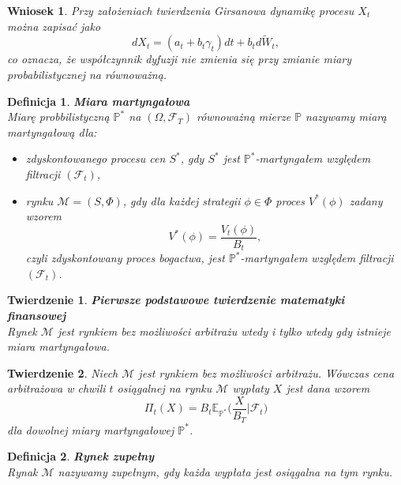 \documentclass{mini}
\theoremstyle{mythstyle}
\newtheorem{Twierdzenie}{Twierdzenie}[chapter]
\newtheorem{Definicja}{Definicja}[chapter]
\newtheorem{Wniosek}{Wniosek}[chapter]
\begin{document}
\begin{Wniosek}
	Przy założeniach twierdzenia Girsanowa dynamikę procesu $X_t$ można zapisać jako
	$$ dX_t = (a_t+b_t \gamma_t)dt + b_t d\widetilde{W}_t,$$
	co oznacza, że współczynnik dyfuzji nie zmienia się przy zmianie miary probabilistycznej na równoważną.\\
\end{Wniosek}
\begin{Definicja}
	\textbf{Miara martyngałowa}\\
	Miarę probbilistyczną $\mathbb{P}^*$ na $(\Omega,\mathcal{F}_T)$ równoważną mierze $\mathbb{P}$ nazywamy miarą martyngałową dla:
	\begin{itemize}
		\item zdyskontowanego procesu cen $S^*$, gdy $S^*$ jest $\mathbb{P}^*$-martyngałem względem filtracji $(\mathcal{F}_t)$,
		\item rynku $\mathcal{M}= (S,\Phi)$, gdy dla każdej strategii $\phi \in \Phi$ proces $V^*(\phi)$ zadany wzorem
		\begin{equation*}
		V^*(\phi) = \frac{V_t(\phi)}{B_t},
		\end{equation*}
		czyli zdyskontowany proces bogactwa, jest $\mathbb{P}^*$-martyngałem względem filtracji $(\mathcal{F}_t)$.\\
	\end{itemize}
\end{Definicja}
\begin{Twierdzenie}
	\textbf{Pierwsze podstawowe twierdzenie matematyki finansowej}\\
	Rynek $\mathcal{M}$ jest rynkiem bez możliwości arbitrażu wtedy i tylko wtedy gdy istnieje miara martyngałowa.\\
\end{Twierdzenie}
\begin{Twierdzenie}
	Niech $\mathcal{M}$ jest rynkiem bez możliwości arbitrażu. Wówczas cena arbitrażowa w chwili $t$ osiągalnej na rynku $\mathcal{M}$ wypłaty $X$ jest dana wzorem
	\begin{equation*}
	\Pi_{t}(X) = B_t \mathbb{E}_{\mathbb{P}^*}  \bigg( \frac{X}{B_T}\bigg|\mathcal{ F}_t\bigg)
	\end{equation*}
	dla dowolnej miary martyngałowej $\mathbb{P}^*$.\\
\end{Twierdzenie}
\begin{Definicja} \textbf{Rynek zupełny}\\
	Rynak $\mathcal{M}$ nazywamy zupełnym, gdy każda wypłata jest osiągalna na tym rynku.\\
\end{Definicja}
\end{document}
